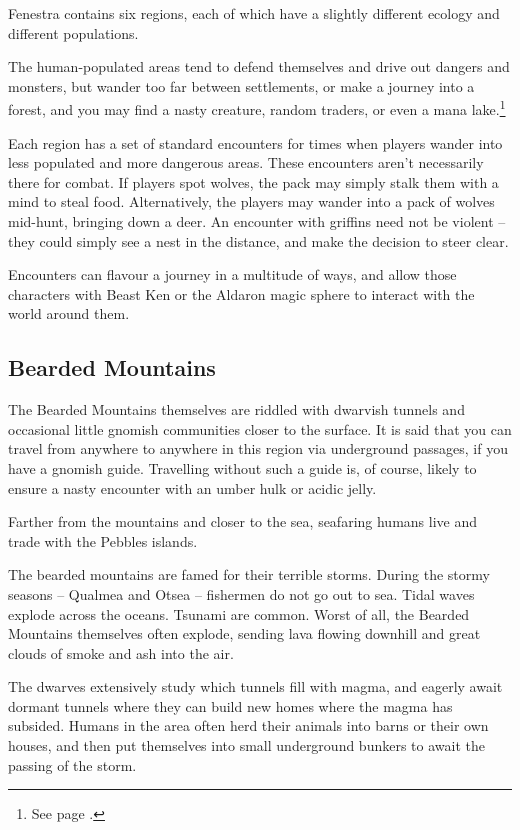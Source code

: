 \begin{multicols}{2}

Fenestra contains six regions, each of which have a slightly different ecology and different populations.

The human-populated areas tend to defend themselves and drive out dangers and monsters, but wander too far between settlements, or make a journey into a forest, and you may find a nasty creature, random traders, or even a mana lake.\footnote{See page \pageref{mana_lake}.}

Each region has a set of standard encounters for times when players wander into less populated and more dangerous areas.  These encounters aren't necessarily there for combat.  If players spot wolves, the pack may simply stalk them with a mind to steal food.  Alternatively, the players may wander into a pack of wolves mid-hunt, bringing down a deer.  An encounter with griffins need not be violent -- they could simply see a nest in the distance, and make the decision to steer clear.

Encounters can flavour a journey in a multitude of ways, and allow those characters with Beast Ken or the Aldaron magic sphere to interact with the world around them.

\subsection{Bearded Mountains}

The Bearded Mountains themselves are riddled with dwarvish tunnels and occasional little gnomish communities closer to the surface.  It is said that you can travel from anywhere to anywhere in this region via underground passages, if you have a gnomish guide.  Travelling without such a guide is, of course, likely to ensure a nasty encounter with an umber hulk or acidic jelly.

Farther from the mountains and closer to the sea, seafaring humans live and trade with the Pebbles islands.

The bearded mountains are famed for their terrible storms.  During the stormy seasons -- Qualmea and Otsea -- fishermen do not go out to sea.  Tidal waves explode across the oceans.  Tsunami are common.  Worst of all, the Bearded Mountains themselves often explode, sending lava flowing downhill and great clouds of smoke and ash into the air.

The dwarves extensively study which tunnels fill with magma, and eagerly await dormant tunnels where they can build new homes where the magma has subsided.  Humans in the area often herd their animals into barns or their own houses, and then put themselves into small underground bunkers to await the passing of the storm.


\end{multicols}
